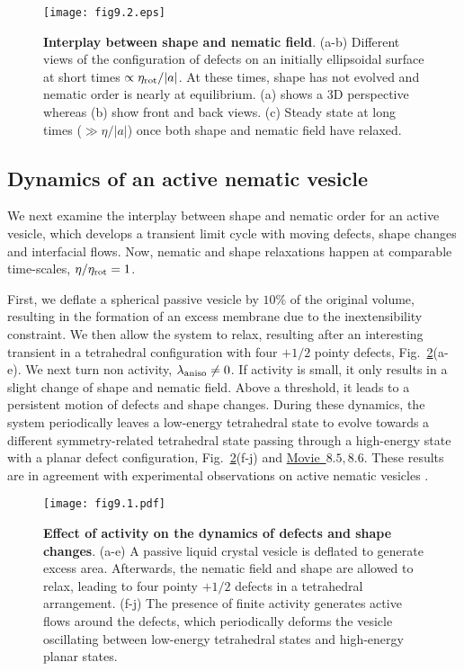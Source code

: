  \begin{figure}
	\centering
	\hspace*{-0.5cm}\texttt{[image: fig9.2.eps]}
	\caption{ \textbf{Interplay between shape and nematic field}. (a-b) Different views of the configuration of defects on an initially ellipsoidal surface at short times $\propto \eta_{\rm rot }/|a|$. At these times, shape has not evolved and nematic order is nearly at equilibrium. (a) shows a 3D  perspective whereas (b) show front and back views. (c) Steady state at long times ($\gg \eta/|a|$) once both shape and nematic field have relaxed.  }
	\label{fig9.1}
\end{figure} 
  
 
 \subsection{Dynamics of an active nematic vesicle }
 
 We next examine the interplay between shape and nematic order for an active vesicle, which develops a transient limit cycle with moving defects, shape changes and interfacial flows. Now, nematic and shape relaxations happen at comparable time-scales, $\eta /\eta_{\rm rot} = 1$.

  First, we deflate a spherical passive vesicle by $10\%$ of the original volume, resulting in the formation of an excess membrane due to the inextensibility constraint. We then allow the system to relax, resulting after an interesting transient in a tetrahedral configuration with four $+1/2$ pointy defects, Fig.~\ref{fig9.2}(a-e). We next turn non activity, $\lambda_{\rm aniso}\ne 0$. If activity is small, it only results in a slight change of shape and nematic field. Above a threshold, it leads to a persistent motion of defects and shape changes. During these dynamics, the system  periodically leaves a low-energy tetrahedral state to evolve towards a different symmetry-related tetrahedral state passing through a high-energy state with a planar defect configuration, Fig.~\ref{fig9.2}(f-j) and \href{https://github.com/waleedmirzaPhD/movies_thesis.git}{Movie~$8.5,8.6$}. These results are in agreement with experimental observations on active nematic vesicles \cite{keber2014}.

  
 
 \begin{figure}
 	\centering
 	\hspace*{-0.5cm}\texttt{[image: fig9.1.pdf]}
 	\caption{ \textbf{Effect of activity on the dynamics of defects and shape changes}. (a-e) A passive liquid crystal vesicle is deflated to generate excess area. Afterwards, the nematic field and shape are  allowed to relax, leading to four pointy  $+1/2$ defects in a tetrahedral arrangement. (f-j) The presence of finite activity generates active flows around the defects, which periodically deforms the vesicle oscillating between low-energy tetrahedral states and high-energy planar states.  }
 	\label{fig9.2}
 \end{figure} 
